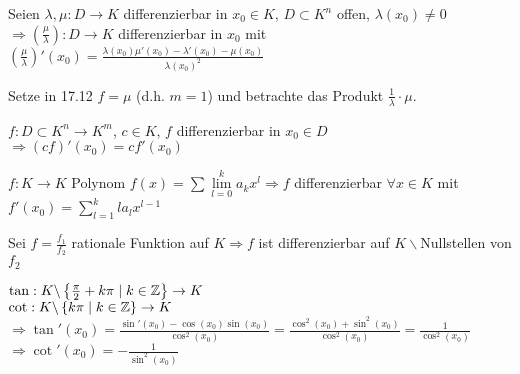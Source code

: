 	\begin{folgerung}
		Seien $\lambda, \mu:D\to K$ differenzierbar in $x_0\in K$, $D\subset K^n$ offen, $\lambda(x_0)
		\neq 0$ \\
		$\Rightarrow \left( \frac{\mu}{\lambda} \right):D\to K$ differenzierbar in $x_0$ mit $\left( 
		\frac{\mu}{\lambda}\right)'(x_0)=\frac{\lambda(x_0)\mu'(x_0)-\lambda'(x_0)-\mu(x_0)}
		{\lambda(x_0)^2}$
	\end{folgerung}
	\begin{beweis}
		Setze in 17.12 $f=\mu$ (d.h. $m=1$) und betrachte das Produkt $\frac{1}{\lambda}\cdot \mu$.
	\end{beweis}

	\begin{beispiel}[Konstanten]
		$f:D\subset K^n\to K^m$, $c\in K$, $f$ differenzierbar in $x_0\in D$ \\
		$\Rightarrow (cf)'(x_0)=cf'(x_0)$
	\end{beispiel}

	\begin{beispiel}[Polynome]
		$f:K\to K$ Polynom $f(x)=\sum\lim\limits_{l=0}^k a_kx^l \Rightarrow f$ differenzierbar 
		$\forall x\in K$ mit $f'(x_0)=\sum\limits_{l=1}^k la_lx^{l-1}$
	\end{beispiel}

	\begin{beispiel}
		Sei $f=\frac{f_1}{f_2}$ rationale Funktion auf $K \Rightarrow f$ ist differenzierbar auf 
		$K\backslash${Nullstellen von $f_2$}
	\end{beispiel}

	\begin{beispiel}
		$\tan:K\backslash\left\lbrace \frac{\pi}{2} + k\pi \mid k\in\mathbb{Z} \right\rbrace\to K$ \\
		$\cot:K\backslash\left\lbrace k\pi \mid k\in\mathbb{Z}\right\rbrace\to K$ \\
		$\Rightarrow \tan'(x_0)=\frac{\sin'(x_0)-\cos(x_0)\sin(x_0)}{\cos^2(x_0)}=\frac{\cos^2(x_0)+
		\sin^2(x_0)}{\cos^2(x_0)}=\frac{1}{\cos^2(x_0)}$ \\
		$\Rightarrow \cot'(x_0)=-\frac{1}{\sin^2(x_0)}$
	\end{beispiel}

